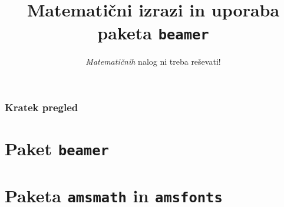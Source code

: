\documentclass{beamer}
\begin{document}



{\theoremstyle{plain}
\newtheorem{izrek}{Izrek}
}


{\theoremstyle{definition}
\newtheorem{definicija}{Definicija}
}



\title{Matematični izrazi in uporaba paketa \texttt{beamer}}
\subtitle{\emph{Matematičnih} nalog ni treba reševati!}
\date{}
\titlepage


\begin{frame}
  \frametitle{Kratek pregled}
  \tableofcontents[pausesections]
\end{frame}

\section{Paket \texttt{beamer}}


\section{Paketa \texttt{amsmath} in \texttt{amsfonts}}

\end{document}
